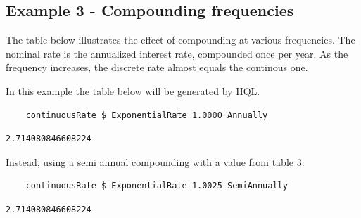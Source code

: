 \documentclass[11pt,a4paper]{article}
\numberwithin{equation}{section}
\begin{document}
	\subsection{Example 3 - Compounding frequencies}

	The table below illustrates the effect of compounding at various frequencies. The nominal rate
	is the annualized interest rate, compounded once per year. As the frequency increases, the discrete
	rate almost equals the continous one.


	In this example the table below will be generated by HQL.

	\FrameSep
	\begin{lstlisting}
	continuousRate $ ExponentialRate 1.0000 Annually
	\end{lstlisting}
	\FrameSep
	\begin{lstlisting}[style=Output]
	2.714080846608224
	\end{lstlisting}

	Instead, using a semi annual compounding with a value from table 3:

	\begin{lstlisting}
	continuousRate $ ExponentialRate 1.0025 SemiAnnually
	\end{lstlisting}
	\FrameSep
	\begin{lstlisting}[style=Output]
	2.714080846608224
	\end{lstlisting}
\end{document}
